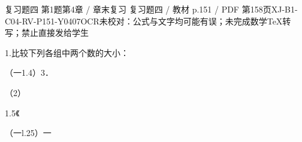 \begin{bankitem}{复习题四 第1题}{第4章 / 章末复习 复习题四 / 教材 p.151 / PDF 第158页}{XJ-B1-C04-RV-P151-Y0407}{OCR未校对：公式与文字均可能有误；未完成数学TeX转写；禁止直接发给学生}
\begin{ocrdraft}
\par
1.比较下列各组中两个数的大小：
\par
（一1.4）3．
\par
（2）
\par
1.5《
\par
（一l.25）一
\end{ocrdraft}
\end{bankitem}

